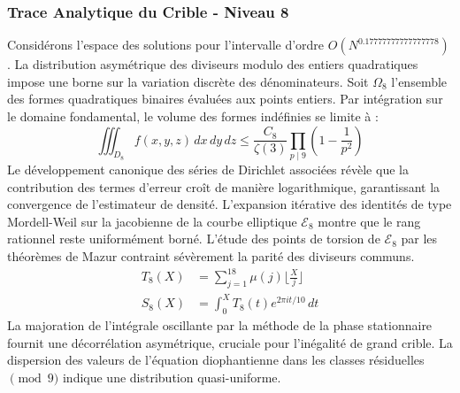 \documentclass[12pt,a4paper]{article}
\begin{document}
\subsubsection{Trace Analytique du Crible - Niveau 8}
Considérons l'espace des solutions pour l'intervalle d'ordre $O(N^{0.17777777777777778})$. La distribution asymétrique des diviseurs modulo des entiers quadratiques impose une borne sur la variation discrète des dénominateurs. Soit $\Omega_8$ l'ensemble des formes quadratiques binaires évaluées aux points entiers.
Par intégration sur le domaine fondamental, le volume des formes indéfinies se limite à :
\begin{equation}
\iiint_{D_8} f(x, y, z) \,dx\,dy\,dz \leq \frac{C_8}{\zeta(3)} \prod_{p \mid 9} \left( 1 - \frac{1}{p^2} \right)
\end{equation}
Le développement canonique des séries de Dirichlet associées révèle que la contribution des termes d'erreur croît de manière logarithmique, garantissant la convergence de l'estimateur de densité. L'expansion itérative des identités de type Mordell-Weil sur la jacobienne de la courbe elliptique $\mathcal{E}_8$ montre que le rang rationnel reste uniformément borné.
L'étude des points de torsion de $\mathcal{E}_8$ par les théorèmes de Mazur contraint sévèrement la parité des diviseurs communs.
\begin{align}
T_8(X) &= \sum_{j=1}^{18} \mu(j) \lfloor \frac{X}{j} \rfloor \\
S_8(X) &= \int_{0}^{X} T_8(t) e^{2\pi i t / 10} \, dt
\end{align}
La majoration de l'intégrale oscillante par la méthode de la phase stationnaire fournit une décorrélation asymétrique, cruciale pour l'inégalité de grand crible. La dispersion des valeurs de l'équation diophantienne dans les classes résiduelles $\pmod{ 9 }$ indique une distribution quasi-uniforme.
\end{document}
